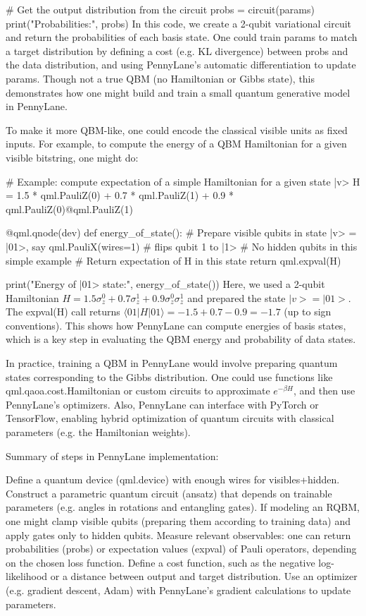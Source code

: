 # Get the output distribution from the circuit
probs = circuit(params)
print("Probabilities:", probs)
In this code, we create a 2-qubit variational circuit and return the probabilities of each basis state. One could train params to match a target distribution by defining a cost (e.g. KL divergence) between probs and the data distribution, and using PennyLane’s automatic differentiation to update params.  Though not a true QBM (no Hamiltonian or Gibbs state), this demonstrates how one might build and train a small quantum generative model in PennyLane.



To make it more QBM-like, one could encode the classical visible units as fixed inputs. For example, to compute the energy of a QBM Hamiltonian for a given visible bitstring, one might do:

# Example: compute expectation of a simple Hamiltonian for a given state |v>
H = 1.5 * qml.PauliZ(0) + 0.7 * qml.PauliZ(1) + 0.9 * qml.PauliZ(0)@qml.PauliZ(1)

@qml.qnode(dev)
def energy_of_state():
    # Prepare visible qubits in state |v> = |01>, say
    qml.PauliX(wires=1)  # flips qubit 1 to |1>
    # No hidden qubits in this simple example
    # Return expectation of H in this state
    return qml.expval(H)

print("Energy of |01> state:", energy_of_state())
Here, we used a 2-qubit Hamiltonian $H=1.5\sigma_z^0+0.7\sigma_z^1+0.9\sigma_z^0\sigma_z^1$ and prepared the state $|v>=|01>$. The expval(H) call returns $\langle 01|H|01\rangle = -1.5 + 0.7 - 0.9 = -1.7$ (up to sign conventions). This shows how PennyLane can compute energies of basis states, which is a key step in evaluating the QBM energy and probability of data states.



In practice, training a QBM in PennyLane would involve preparing quantum states corresponding to the Gibbs distribution. One could use functions like qml.qaoa.cost.Hamiltonian or custom circuits to approximate $e^{-\beta H}$, and then use PennyLane’s optimizers. Also, PennyLane can interface with PyTorch or TensorFlow, enabling hybrid optimization of quantum circuits with classical parameters (e.g. the Hamiltonian weights).



Summary of steps in PennyLane implementation:



Define a quantum device (qml.device) with enough wires for visibles+hidden.
Construct a parametric quantum circuit (ansatz) that depends on trainable parameters (e.g. angles in rotations and entangling gates).
If modeling an RQBM, one might clamp visible qubits (preparing them according to training data) and apply gates only to hidden qubits.
Measure relevant observables: one can return probabilities (probs) or expectation values (expval) of Pauli operators, depending on the chosen loss function.
Define a cost function, such as the negative log-likelihood or a distance between output and target distribution.
Use an optimizer (e.g. gradient descent, Adam) with PennyLane’s gradient calculations to update parameters.




